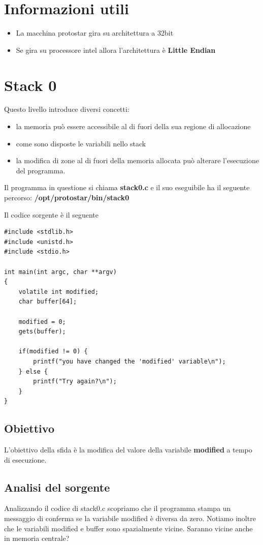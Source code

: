 \section{Informazioni utili}
\begin{itemize}
    \item La macchina protostar gira su architettura a 32bit
    \item Se gira su processore intel allora l'architettura è \textbf{Little Endian}
\end{itemize}

\section{Stack 0}
Questo livello introduce diversi concetti:
\begin{itemize}
    \item la memoria può essere accessibile al di fuori della sua regione di allocazione
    \item come sono disposte le variabili nello stack
    \item la modifica di zone al di fuori della memoria allocata può alterare l'esecuzione del programma.
\end{itemize}
Il programma in questione si chiama \textbf{stack0.c} e il suo eseguibile ha il seguente percorso: \textbf{/opt/protostar/bin/stack0}

Il codice sorgente è il seguente
\begin{lstlisting}[style=cstyle]
#include <stdlib.h>
#include <unistd.h>
#include <stdio.h>

int main(int argc, char **argv)
{
    volatile int modified;
    char buffer[64];

    modified = 0;
    gets(buffer);

    if(modified != 0) {
        printf("you have changed the 'modified' variable\n");
    } else {
        printf("Try again?\n");
    }
}
\end{lstlisting}

\subsection{Obiettivo}
L'obiettivo della sfida è la modifica del valore della variabile  \textbf{modified} a tempo di esecuzione.

\subsection{Analisi del sorgente}
Analizzando il codice di stack0.c scopriamo che il programma stampa un messaggio di conferma se la variabile modified è diversa da zero.
Notiamo inoltre che le variabili modified e buffer sono spazialmente vicine. Saranno vicine anche in memoria centrale?

